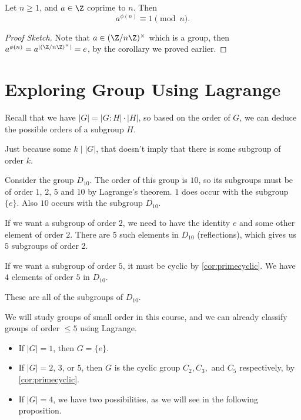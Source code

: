 \documentclass[a4]{scrreprt}
\newcommand{\newsection}{\section}
\begin{document}
\begin{theorem}
	Let $n \geq 1$, and $a \in \Z$ coprime to $n$. Then
	$$
	a^{\phi(n)} \equiv 1 \pmod{n}.
	$$
\end{theorem}
\begin{proof}[Proof Sketch]
	Note that $a \in (\Z/n\Z)^\times$ which is a group, then $a^{\phi(n)} = a^{| (\Z/n\Z)^\times|} = e$, by the corollary we proved earlier.
\end{proof}

\newsection{Exploring Group Using Lagrange}

Recall that we have $|G| = |G:H| \cdot |H|$, so based on the order of $G$, we can deduce the possible orders of a subgroup $H$.

\begin{remark}
	Just because some $k \mid |G|$, that doesn't imply that there is some subgroup of order $k$.
\end{remark}

\begin{example}[Subgroups of $D_{10}$]
	Consider the group $D_{10}$. The order of this group is $10$, so its subgroups must be of order $1$, $2$, $5$ and $10$ by Lagrange's theorem.
	$1$ does occur with the subgroup $\{e\}$. Also $10$ occurs with the subgroup $D_{10}$.

	If we want a subgroup of order $2$, we need to have the identity $e$ and some other element of order $2$. There are 5 such elements in $D_{10}$ (reflections), which gives us $5$ subgroups of order 2.

	If we want a subgroup of order $5$, it must be cyclic by \autoref{cor:primecyclic}. We have $4$ elements of order $5$ in $D_{10}$.

	These are all of the subgroups of $D_{10}$.
\end{example}

We will study groups of small order in this course, and we can already classify groups of order $\leq 5$ using Lagrange.

\begin{itemize}
	\item If $|G| = 1$, then $G = \{e\}$.
	\item If $|G| = 2$, $3$, or $5$, then $G$ is the cyclic group $C_2, C_3,$ and $C_5$ respectively, by \autoref{cor:primecyclic}.
	\item If $|G| = 4$, we have two possibilities, as we will see in the following proposition.
\end{itemize}
\end{document}
